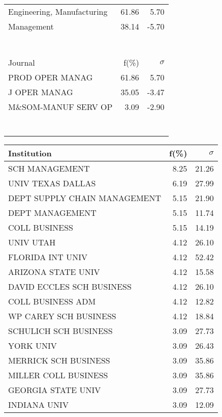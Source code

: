 \documentclass[a4paper,11pt]{report}
\begin{document}
\begin{landscape}
\begin{table}[!ht]
{\begin{tabular}{|l r  r|}
Engineering, Manufacturing & 61.86 & 5.70\\
Management & 38.14 & -5.70\\
 &  & \\
 &  & \\
 &  & \\
 &  & \\
 &  & \\
 &  & \\
 &  & \\
\hline
\hline
Journal & f(\%) & $\sigma$\\
\hline
PROD OPER MANAG & 61.86 & 5.70\\
J OPER MANAG & 35.05 & -3.47\\
M\&SOM-MANUF SERV OP & 3.09 & -2.90\\
 &  & \\
 &  & \\
 &  & \\
 &  & \\
 &  & \\
 &  & \\
 &  & \\
\hline
\end{tabular}
}
{\scriptsize\begin{tabular}{|l r r|}
\hline
Institution & f(\%) & $\sigma$\\
\hline
SCH MANAGEMENT & 8.25 & 21.26\\
UNIV TEXAS DALLAS & 6.19 & 27.99\\
DEPT SUPPLY CHAIN MANAGEMENT & 5.15 & 21.90\\
DEPT MANAGEMENT & 5.15 & 11.74\\
COLL BUSINESS & 5.15 & 14.19\\
UNIV UTAH & 4.12 & 26.10\\
FLORIDA INT UNIV & 4.12 & 52.42\\
ARIZONA STATE UNIV & 4.12 & 15.58\\
DAVID ECCLES SCH BUSINESS & 4.12 & 26.10\\
COLL BUSINESS ADM & 4.12 & 12.82\\
WP CAREY SCH BUSINESS & 4.12 & 18.84\\
SCHULICH SCH BUSINESS & 3.09 & 27.73\\
YORK UNIV & 3.09 & 26.43\\
MERRICK SCH BUSINESS & 3.09 & 35.86\\
MILLER COLL BUSINESS & 3.09 & 35.86\\
GEORGIA STATE UNIV & 3.09 & 27.73\\
INDIANA UNIV & 3.09 & 12.09\\

\end{tabular}}
\end{table}
\end{landscape}
\end{document}
